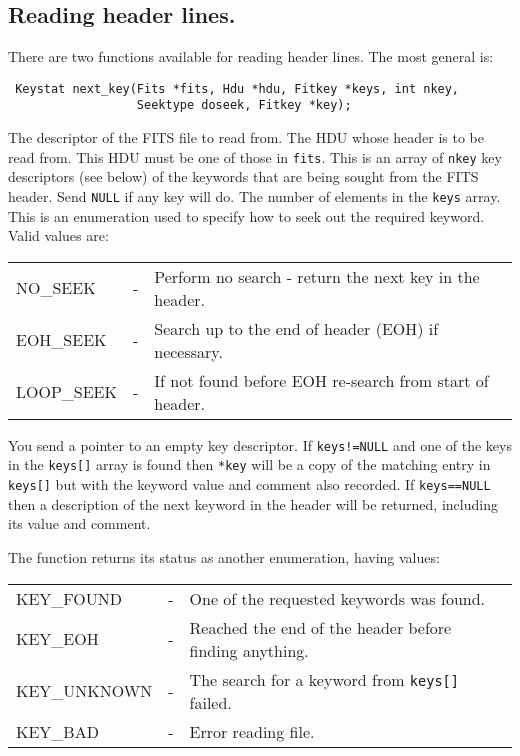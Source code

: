 \subsection{Reading header lines.}
There are two functions available for reading header lines. The most
general is:
\label{next_key}\begin{verbatim}
 Keystat next_key(Fits *fits, Hdu *hdu, Fitkey *keys, int nkey,
                  Seektype doseek, Fitkey *key);
\end{verbatim}
\begin{arglist}
 The descriptor of the FITS file to read from.
 The HDU whose header is to be read from. This HDU must be
           one of those in \verb`fits`.
 This is an array of \verb`nkey` key descriptors (see
           below) of the keywords that are being sought from the FITS
           header. Send \verb`NULL` if any key will do.
 The number of elements in the \verb`keys` array.
\label{doseek} This is an enumeration used to
           specify how to seek out the required keyword.
           Valid values are:\nopagebreak

           \begin{tabular}{lcl}
            NO\_SEEK & - &  Perform no search - return the next key in
                              the header. \\
            EOH\_SEEK & - & Search up to the end of header (EOH) if
                              necessary. \\
            LOOP\_SEEK & - & If not found before EOH re-search from
                              start of header. \\
           \end{tabular}

 You send a pointer to an empty key descriptor. If
           \verb`keys!=NULL` and one of the keys in the \verb`keys[]`
           array is found then \verb`*key` will be a copy of the
           matching entry in \verb`keys[]` but with the keyword value
           and comment also recorded. 
           If \verb`keys==NULL` then a description of the next keyword
           in the header will be returned, including its value and comment.
\end{arglist}

The function returns its status as another enumeration, having
values:

\label{Keystat}\begin{tabular}{lcl}
 KEY\_FOUND & - & One of the requested keywords was found.\\
 KEY\_EOH & - & Reached the end of the header before finding anything.\\
 KEY\_UNKNOWN & - & The search for a keyword from \verb`keys[]` failed.\\
 KEY\_BAD & - & Error reading file.\\
\end{tabular}


